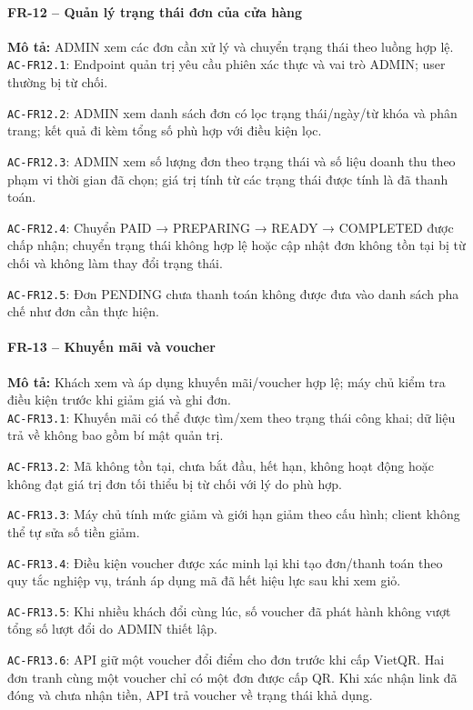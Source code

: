 \paragraph{FR-12 -- Quản lý trạng thái đơn của cửa hàng}
\textbf{Mô tả:} ADMIN xem các đơn cần xử lý và chuyển trạng thái theo luồng hợp lệ.\\
\noindent\texttt{AC-FR12.1}: Endpoint quản trị yêu cầu phiên xác thực và vai trò ADMIN; user thường bị từ chối.\par
\noindent\texttt{AC-FR12.2}: ADMIN xem danh sách đơn có lọc trạng thái/ngày/từ khóa và phân trang; kết quả đi kèm tổng số phù hợp với điều kiện lọc.\par
\noindent\texttt{AC-FR12.3}: ADMIN xem số lượng đơn theo trạng thái và số liệu doanh thu theo phạm vi thời gian đã chọn; giá trị tính từ các trạng thái được tính là đã thanh toán.\par
\noindent\texttt{AC-FR12.4}: Chuyển PAID → PREPARING → READY → COMPLETED được chấp nhận; chuyển trạng thái không hợp lệ hoặc cập nhật đơn không tồn tại bị từ chối và không làm thay đổi trạng thái.\par
\noindent\texttt{AC-FR12.5}: Đơn PENDING chưa thanh toán không được đưa vào danh sách pha chế như đơn cần thực hiện.\par

\paragraph{FR-13 -- Khuyến mãi và voucher}
\textbf{Mô tả:} Khách xem và áp dụng khuyến mãi/voucher hợp lệ; máy chủ kiểm tra điều kiện trước khi giảm giá và ghi đơn.\\
\noindent\texttt{AC-FR13.1}: Khuyến mãi có thể được tìm/xem theo trạng thái công khai; dữ liệu trả về không bao gồm bí mật quản trị.\par
\noindent\texttt{AC-FR13.2}: Mã không tồn tại, chưa bắt đầu, hết hạn, không hoạt động hoặc không đạt giá trị đơn tối thiểu bị từ chối với lý do phù hợp.\par
\noindent\texttt{AC-FR13.3}: Máy chủ tính mức giảm và giới hạn giảm theo cấu hình; client không thể tự sửa số tiền giảm.\par
\noindent\texttt{AC-FR13.4}: Điều kiện voucher được xác minh lại khi tạo đơn/thanh toán theo quy tắc nghiệp vụ, tránh áp dụng mã đã hết hiệu lực sau khi xem giỏ.\par
\noindent\texttt{AC-FR13.5}: Khi nhiều khách đổi cùng lúc, số voucher đã phát hành không vượt tổng số lượt đổi do ADMIN thiết lập.\par
\noindent\texttt{AC-FR13.6}: API giữ một voucher đổi điểm cho đơn trước khi cấp VietQR. Hai đơn tranh cùng một voucher chỉ có một đơn được cấp QR. Khi xác nhận link đã đóng và chưa nhận tiền, API trả voucher về trạng thái khả dụng.\par

